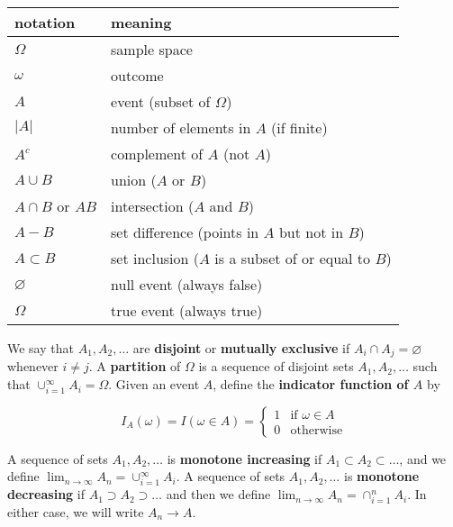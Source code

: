 \begin{longtable}[]{@{}
  >{\raggedright\arraybackslash}p{}
  >{\raggedright\arraybackslash}p{}@{}}
\toprule\noalign{}
\begin{minipage}[b]{\linewidth}\raggedright
notation
\end{minipage} & \begin{minipage}[b]{\linewidth}\raggedright
meaning
\end{minipage} \\
\midrule\noalign{}
\endhead
\bottomrule\noalign{}
\endlastfoot
\(\Omega\) & sample space \\
\(\omega\) & outcome \\
\(A\) & event (subset of \(\Omega\)) \\
\(\vert A \vert\) & number of elements in \(A\) (if finite) \\
\(A^c\) & complement of \(A\) (not \(A\)) \\
\(A \cup B\) & union (\(A\) or \(B\)) \\
\(A \cap B\) or \(AB\) & intersection (\(A\) and \(B\)) \\
\(A - B\) & set difference (points in \(A\) but not in \(B\)) \\
\(A \subset B\) & set inclusion (\(A\) is a subset of or equal to
\(B\)) \\
\(\varnothing\) & null event (always false) \\
\(\Omega\) & true event (always true) \\
\end{longtable}

We say that \(A_1, A_2, \dots\) are \textbf{disjoint} or
\textbf{mutually exclusive} if \(A_i \cap A_j = \varnothing\) whenever
\(i \neq j\). A \textbf{partition} of \(\Omega\) is a sequence of
disjoint sets \(A_1, A_2, \dots\) such that
\(\cup_{i=1}^\infty A_i = \Omega\). Given an event \(A\), define the
\textbf{indicator function of \(A\)} by

\[ I_A(\omega) = I(\omega \in A) = \begin{cases}
1 &\text{if } \omega \in A \\
0 &\text{otherwise}
\end{cases}\]

A sequence of sets \(A_1, A_2, \dots\) is \textbf{monotone increasing}
if \(A_1 \subset A_2 \subset \dots\), and we define
\(\lim_{n \rightarrow \infty} A_n = \cup_{i=1}^\infty A_i\). A sequence
of sets \(A_1, A_2, \dots\) is \textbf{monotone decreasing} if
\(A_1 \supset A_2 \supset \dots\) and then we define
\(\lim_{n \rightarrow \infty} A_n = \cap_{i=1}^n A_i\). In either case,
we will write \(A_n \rightarrow A\).


